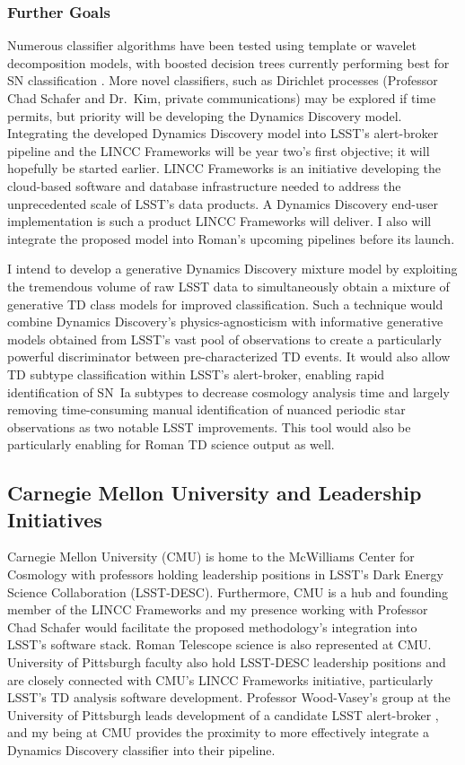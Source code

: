\documentclass[modern]{aastex631}
\begin{document}
\subsubsection{Further Goals}
Numerous classifier algorithms have been tested using template or wavelet decomposition models, with boosted decision trees currently performing best for SN classification \citep{Malz2019}. 
More novel classifiers, such as Dirichlet processes (Professor Chad Schafer and Dr.\ Kim, private communications) may be explored if time permits, but priority will be developing the Dynamics Discovery model.
Integrating the developed Dynamics Discovery model into LSST's alert-broker pipeline and the LINCC Frameworks will be year two's first objective; it will hopefully be started earlier. 
LINCC Frameworks is an initiative developing the cloud-based software and database infrastructure needed to address the unprecedented scale of LSST's data products. 
A Dynamics Discovery end-user implementation is such a product LINCC Frameworks will deliver. 
I also will integrate the proposed model into Roman's upcoming pipelines before its launch.  

I intend to develop a generative Dynamics Discovery mixture model by exploiting the tremendous volume of raw LSST data to simultaneously obtain a mixture of generative TD class models for improved classification. 
Such a technique would combine Dynamics Discovery's physics-agnosticism with informative generative models obtained from LSST's vast pool of observations to create a particularly powerful discriminator between pre-characterized TD events. 
It would also allow TD subtype classification within LSST's alert-broker, enabling rapid identification of SN~Ia subtypes to decrease cosmology analysis time and largely removing time-consuming manual identification of nuanced periodic star observations as two notable LSST improvements. 
This tool would also be particularly enabling for Roman TD science output as well. 

\subsection{Carnegie Mellon University and Leadership Initiatives}
Carnegie Mellon University (CMU) is home to the McWilliams Center for Cosmology with professors holding leadership positions in LSST's Dark Energy Science Collaboration (LSST-DESC). 
Furthermore, CMU is a hub and founding member of the LINCC Frameworks and my presence working with Professor Chad Schafer would facilitate the proposed methodology's integration into LSST's software stack.  
Roman Telescope science is also represented at CMU. 
University of Pittsburgh faculty also hold LSST-DESC leadership positions and are closely connected with CMU's LINCC Frameworks initiative, particularly LSST's TD analysis software development. 
Professor Wood-Vasey's group at the University of Pittsburgh leads development of a candidate LSST alert-broker \citep{Raen2022}, and my being at CMU provides the proximity to more effectively integrate a Dynamics Discovery classifier into their pipeline. 
\end{document}
